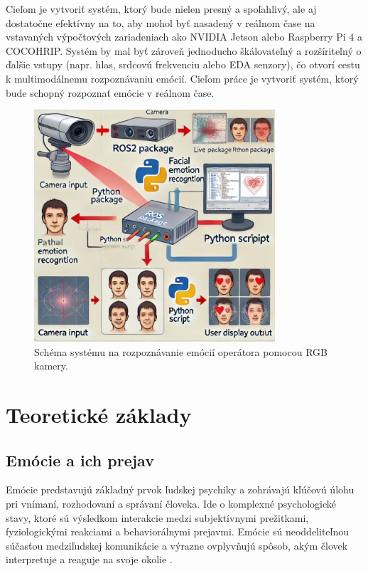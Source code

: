 Cieľom je vytvoriť systém, ktorý bude nielen presný a spoľahlivý, ale aj dostatočne efektívny na to, aby mohol byť nasadený v reálnom čase na vstavaných výpočtových zariadeniach ako 
NVIDIA Jetson alebo Raspberry Pi 4 a COCOHRIP. Systém by mal byť zároveň jednoducho škálovateľný a rozšíriteľný o ďalšie vstupy (napr. hlas, srdcovú frekvenciu alebo EDA senzory), čo otvorí cestu k multimodálnemu rozpoznávaniu emócií.
Cieľom práce je vytvoriť systém, ktorý bude schopný rozpoznať emócie v reálnom čase.\
\begin{figure}[!htpb]
    \centering
    \includegraphics[width=0.8\textwidth]{img/connection.png}
    \caption{Schéma systému na rozpoznávanie emócií operátora pomocou RGB kamery.} 
    \label{fig:schema}
\end{figure}
\section{Teoretické základy}
\label{sec:theory}
\subsection{Emócie a ich prejav}
Emócie predstavujú základný prvok ľudskej psychiky a zohrávajú kľúčovú úlohu pri vnímaní, rozhodovaní a správaní človeka. Ide o komplexné psychologické stavy, ktoré sú výsledkom interakcie medzi subjektívnymi prežitkami, 
fyziologickými reakciami a behaviorálnymi prejavmi. 
Emócie sú neoddeliteľnou súčasťou medziľudskej komunikácie a výrazne ovplyvňujú spôsob, akým človek interpretuje a reaguje na svoje okolie \cite{article01}.

